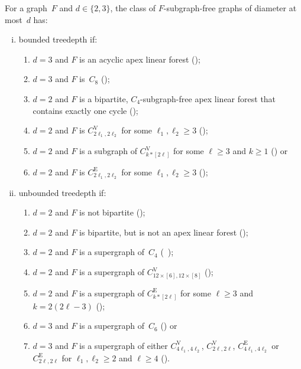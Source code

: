 \documentclass[runningheads,envcountsame]{llncs}
\newcommand{\sharedVertex}[1]{C^{\mathrm{V}}_{#1}}
\newcommand{\sharedEdge}[1]{C^{\mathrm{E}}_{#1}}
\newcommand{\forbiddenGraph}{F}
\begin{document}
\begin{theorem}\label{t-d23}
For a graph~$\forbiddenGraph$ and $d \in \{2,3\}$,
the class of $\forbiddenGraph$-subgraph-free graphs of diameter at most~$d$ has:\\[-5mm]
\begin{enumerate}[(i)]
\item bounded treedepth if:
\begin{enumerate}[1.]
\item $d=3$ and $\forbiddenGraph$ is an acyclic apex linear forest ();
\item $d=3$ and $\forbiddenGraph$ is~$C_8$ ();
\item $d=2$ and $\forbiddenGraph$ is a bipartite, $C_4$-subgraph-free apex linear forest that contains exactly one cycle ();
\item $d=2$ and $\forbiddenGraph$ is $\sharedVertex{2\ell_1,2\ell_2}$ for some $\ell_1,\ell_2 \geq 3$ ();
\item $d=2$ and $\forbiddenGraph$ is a subgraph of $\sharedVertex{k*[2\ell]}$ for some $\ell\geq 3$ and $k\geq 1$ () or
\item $d=2$ and $\forbiddenGraph$ is $\sharedEdge{2\ell_1,2\ell_2}$ for some $\ell_1,\ell_2\geq 3$ ();\\[-9pt]
\end{enumerate}

\item unbounded treedepth if:
\begin{enumerate}[1.]
\item $d=2$ and $\forbiddenGraph$ is not bipartite ();
\item $d=2$ and $\forbiddenGraph$ 
is bipartite, but is not an apex linear forest ();
\item $d=2$ and $\forbiddenGraph$ is a supergraph of~$C_4$ (~\cite{ERTS66});
\item$d=2$ and  $\forbiddenGraph$ is a supergraph of 
$\sharedVertex{12\times [6],12\times [8]}$
();
\item $d=2$ and $\forbiddenGraph$ is a supergraph of $\sharedEdge{k*[2\ell]}$ for some $\ell \geq 3$ and $k = 2 (2\ell -3)$ ();
\item $d=3$ and $\forbiddenGraph$ is a supergraph of~$C_6$ () or
\item $d=3$ and $\forbiddenGraph$ is a supergraph of either $\sharedVertex{4\ell_1,4\ell_2}$, $\sharedVertex{2\ell,2\ell}$,  $\sharedEdge{4\ell_1,4\ell_2}$ or $\sharedEdge{2\ell,2\ell}$ for $\ell_1,\ell_2 \geq 2$ and $\ell\geq 4$ ().
\end{enumerate}
\end{enumerate}
\end{theorem}
\end{document}
